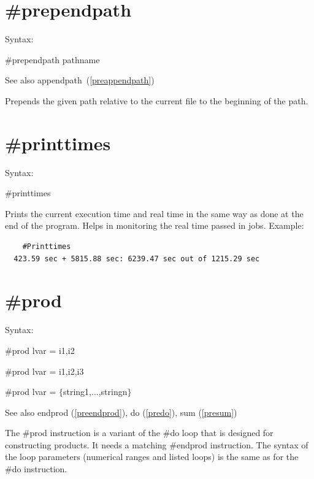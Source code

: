  
\section{\#prependpath}
\label{preprependpath}

\noindent Syntax:

\#prependpath pathname

\noindent See also appendpath~(\ref{preappendpath})

\noindent Prepends the given path relative to the current file to the beginning
of the \FORM{} path.

 
\section{\#printtimes}
\label{preprinttimes}

\noindent Syntax:

\#printtimes

\noindent Prints the current execution time and real 
time in the same way as done at the end of the program. Helps in monitoring 
the real time passed in \TFORM{} jobs.
Example:
\begin{verbatim}
    #Printtimes
  423.59 sec + 5815.88 sec: 6239.47 sec out of 1215.29 sec
\end{verbatim}


\section{\#prod}
\label{preprod}

\noindent Syntax:

\#prod lvar = i1,i2

\#prod lvar = i1,i2,i3

\#prod lvar = $\{$string1,...,stringn$\}$
 
\noindent See also endprod (\ref{preendprod}), do (\ref{predo}), 
                    sum (\ref{presum})

\noindent The \#prod instruction is a 
variant of the \#do loop that is designed for constructing 
products. It needs a matching \#endprod instruction. 
The syntax of the loop parameters (numerical ranges and listed loops) is 
the same as for the \#do instruction.

